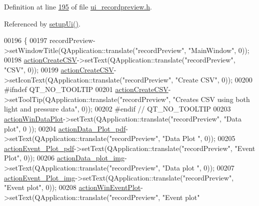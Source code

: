 Definition at line \hyperlink{a00053_source_l00195}{195} of file \hyperlink{a00053_source}{ui\+\_\+recordpreview.\+h}.



Referenced by \hyperlink{a00053_source_l00060}{setup\+Ui()}.


\begin{DoxyCode}
00196     \{
00197         recordPreview->setWindowTitle(QApplication::translate(\textcolor{stringliteral}{"recordPreview"}, \textcolor{stringliteral}{"MainWindow"}, 0));
00198         \hyperlink{a00028_ae81b7303db9e9c5d730c59b86ec0e960}{actionCreateCSV}->setText(QApplication::translate(\textcolor{stringliteral}{"recordPreview"}, \textcolor{stringliteral}{"CSV"}, 0));
00199         \hyperlink{a00028_ae81b7303db9e9c5d730c59b86ec0e960}{actionCreateCSV}->setIconText(QApplication::translate(\textcolor{stringliteral}{"recordPreview"}, \textcolor{stringliteral}{"Create CSV"}, 
      0));
00200 \textcolor{preprocessor}{#ifndef QT\_NO\_TOOLTIP}
00201         \hyperlink{a00028_ae81b7303db9e9c5d730c59b86ec0e960}{actionCreateCSV}->setToolTip(QApplication::translate(\textcolor{stringliteral}{"recordPreview"}, \textcolor{stringliteral}{"Creates CSV
       using both light and pressure data"}, 0));
00202 \textcolor{preprocessor}{#endif // QT\_NO\_TOOLTIP}
00203         \hyperlink{a00028_aa09067a9c96c9cd78f75261a9fcb89f0}{actionWinDataPlot}->setText(QApplication::translate(\textcolor{stringliteral}{"recordPreview"}, \textcolor{stringliteral}{"Data plot"}, 0
      ));
00204         \hyperlink{a00028_a19203ba5fef3bc68f3d88f1dd3c94777}{actionData\_Plot\_pdf}->setText(QApplication::translate(\textcolor{stringliteral}{"recordPreview"}, \textcolor{stringliteral}{"Data Plot
      "}, 0));
00205         \hyperlink{a00028_a4369770edbf9cb6131a066ca10b3f863}{actionEvent\_Plot\_pdf}->setText(QApplication::translate(\textcolor{stringliteral}{"recordPreview"}, \textcolor{stringliteral}{"Event
       Plot"}, 0));
00206         \hyperlink{a00028_ae841c150cf6131bef2e8d12da0401ce2}{actionData\_plot\_img}->setText(QApplication::translate(\textcolor{stringliteral}{"recordPreview"}, \textcolor{stringliteral}{"Data plot
      "}, 0));
00207         \hyperlink{a00028_a789f5466c7f1781c13d4d027e982ca55}{actionEvent\_Plot\_img}->setText(QApplication::translate(\textcolor{stringliteral}{"recordPreview"}, \textcolor{stringliteral}{"Event
       plot"}, 0));
00208         \hyperlink{a00028_ac72ec9c8679d46fd43a87f99ee6db893}{actionWinEventPlot}->setText(QApplication::translate(\textcolor{stringliteral}{"recordPreview"}, \textcolor{stringliteral}{"Event plot"}

\end{DoxyCode}
